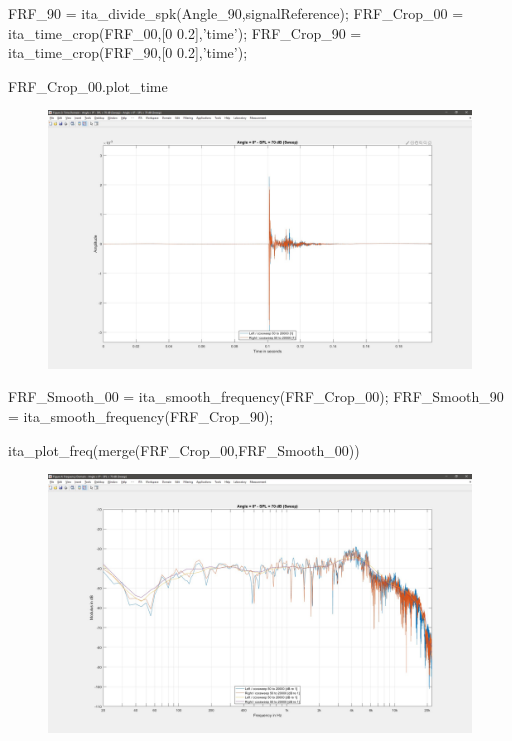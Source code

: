 \documentclass[12pt, a4paper, twoside, onecolumn]{article}%
\begin{document}
\begin{matlabbox}
FRF_90 = ita_divide_spk(Angle_90,signalReference); %
FRF_Crop_00 = ita_time_crop(FRF_00,[0 0.2],'time'); %
FRF_Crop_90 = ita_time_crop(FRF_90,[0 0.2],'time'); %

FRF_Crop_00.plot_time

\end{matlabbox}
\begin{figure}[H] \centering
\includegraphics[width=.7\textwidth]{Figures/E12.jpg}
\end{figure}
\pagebreak
\begin{matlabbox}
FRF_Smooth_00 = ita_smooth_frequency(FRF_Crop_00); %
FRF_Smooth_90 = ita_smooth_frequency(FRF_Crop_90); %

ita_plot_freq(merge(FRF_Crop_00,FRF_Smooth_00))
\end{matlabbox}
\begin{figure}[H] \centering
\includegraphics[width=.7\textwidth]{Figures/E13.jpg}
\end{figure}
\end{document}
